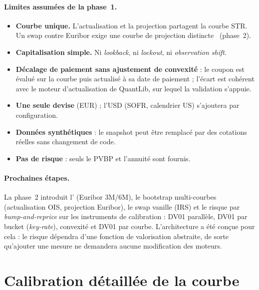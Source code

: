 \documentclass[11pt,a4paper]{article}
\newcommand{\estr}{\texorpdfstring{\texteuro STR}{EUR STR}}
\newcommand{\code}[1]{\texttt{\detokenize{#1}}}
\theoremstyle{plain}
\theoremstyle{definition}
\theoremstyle{remark}
\begin{document}
\paragraph{Limites assumées de la phase~1.}
\begin{itemize}
  \item \textbf{Courbe unique.} L'actualisation et la projection partagent la courbe \estr{}. Un swap
        contre Euribor exige une courbe de projection distincte~\cite{ametrano2013,andersen2010}
        (phase~2).
  \item \textbf{Capitalisation simple.} Ni \emph{lookback}, ni \emph{lockout}, ni \emph{observation shift}.
  \item \textbf{Décalage de paiement sans ajustement de convexité} : le coupon est évalué sur la courbe
        puis actualisé à sa date de paiement ; l'écart est cohérent avec le moteur d'actualisation de
        QuantLib, sur lequel la validation s'appuie.
  \item \textbf{Une seule devise} (EUR) ; l'USD (SOFR, calendrier US) s'ajoutera par configuration.
  \item \textbf{Données synthétiques} : le snapshot peut être remplacé par des cotations réelles sans
        changement de code.
  \item \textbf{Pas de risque} : seuls le PVBP et l'annuité sont fournis.
\end{itemize}

\paragraph{Prochaines étapes.} La phase~2 introduit l'\code{IborIndex} (Euribor 3M/6M), le bootstrap
multi-courbes (actualisation OIS, projection Euribor), le swap vanille (IRS) et le risque par
\emph{bump-and-reprice} sur les instruments de calibration : DV01 parallèle, DV01 par bucket
(\emph{key-rate}), convexité et DV01 par courbe. L'architecture a été conçue pour cela : le risque
dépendra d'une fonction de valorisation abstraite, de sorte qu'ajouter une mesure ne demandera
aucune modification des moteurs.

\appendix
\section{Calibration détaillée de la courbe}\label{app:pillars}

\begin{table}[H]
\centering
\caption{Piliers calibrés sur le snapshot synthétique du \ValuationDate{} : cotation, facteur
d'actualisation, taux zéro continu, itérations de Brent et résidu final (taux décimal).}
\setlength{\tabcolsep}{4pt}
\small

\end{table}
\end{document}
